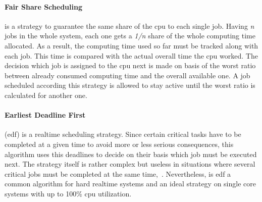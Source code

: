 \paragraph{Fair Share Scheduling}
is a strategy to guarantee the same share of the \ac{cpu} to each single job.
Having \textit{n} jobs in the whole system, each one gets a \textit{1/n} share of the whole computing time allocated.
As a result, the computing time used so far must be tracked along with each job.
This time is compared with the actual overall time the \ac{cpu} worked.
The decision which job is assigned to the \ac{cpu} next is made on basis of the worst ratio between already consumed computing time and the overall available one.
A job scheduled according this strategy is allowed to stay active until the worst ratio is calculated for another one\cite{mandl2014Grundkurs}.

\paragraph{Earliest Deadline First}
(\ac{edf}) is a realtime scheduling strategy.
Since certain critical tasks have to be completed at a given time to avoid more or less serious consequences, this algorithm uses this deadlines to decide on their basis which job must be executed next.
The strategy itself is rather complex but useless in situations where several critical jobs must be completed at the same time\cite{mandl2014Grundkurs},~\cite{brause2017betriebssysteme}.
Nevertheless, is \ac{edf} a common algorithm for hard realtime systems and an ideal strategy on single core systems with up to 100\% \ac{cpu} utilization\cite{brause2017betriebssysteme}.


